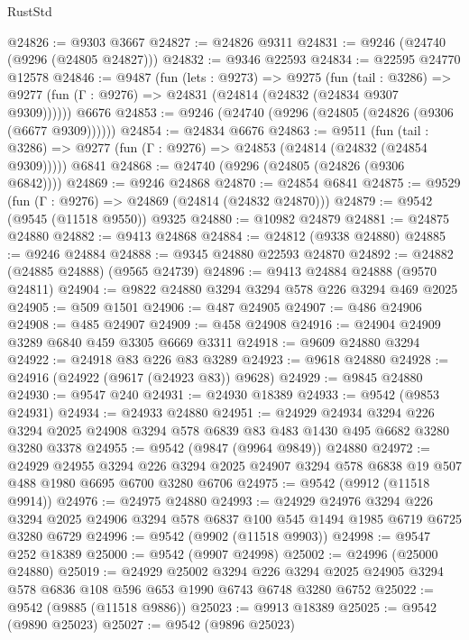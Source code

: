 \begin{lexlean}{RustStd}
\begin{coremodule}
@24826 := @9303 @3667
@24827 := @24826 @9311
@24831 := @9246 (@24740 (@9296 (@24805 @24827)))
@24832 := @9346 @22593
@24834 := @22595 @24770 @12578
@24846 := @9487
    (fun (lets : @9273) =>
    @9275
      (fun (tail : @3286) =>
      @9277 (fun (Γ : @9276) => @24831 (@24814 (@24832 (@24834 @9307 @9309))))))
    @6676
@24853 := @9246 (@24740 (@9296 (@24805 (@24826 (@9306 (@6677 @9309))))))
@24854 := @24834 @6676
@24863 := @9511
    (fun (tail : @3286) => @9277 (fun (Γ : @9276) => @24853 (@24814 (@24832 (@24854 @9309)))))
    @6841
@24868 := @24740 (@9296 (@24805 (@24826 (@9306 @6842))))
@24869 := @9246 @24868
@24870 := @24854 @6841
@24875 := @9529 (fun (Γ : @9276) => @24869 (@24814 (@24832 @24870)))
@24879 := @9542 (@9545 (@11518 @9550)) @9325
@24880 := @10982 @24879
@24881 := @24875 @24880
@24882 := @9413 @24868
@24884 := @24812 (@9338 @24880)
@24885 := @9246 @24884
@24888 := @9345 @24880 @22593 @24870
@24892 := @24882 (@24885 @24888) (@9565 @24739)
@24896 := @9413 @24884 @24888 (@9570 @24811)
@24904 := @9822 @24880 @3294 @3294 @578 @226 @3294 @469 @2025
@24905 := @509 @1501
@24906 := @487 @24905
@24907 := @486 @24906
@24908 := @485 @24907
@24909 := @458 @24908
@24916 := @24904 @24909 @3289 @6840 @459 @3305 @6669 @3311
@24918 := @9609 @24880 @3294
@24922 := @24918 @83 @226 @83 @3289
@24923 := @9618 @24880
@24928 := @24916 (@24922 (@9617 (@24923 @83)) @9628)
@24929 := @9845 @24880
@24930 := @9547 @240
@24931 := @24930 @18389
@24933 := @9542 (@9853 @24931)
@24934 := @24933 @24880
@24951 := @24929
    @24934
    @3294
    @226
    @3294
    @2025
    @24908
    @3294
    @578
    @6839
    @83
    @483
    @1430
    @495
    @6682
    @3280
    @3280
    @3378
@24955 := @9542 (@9847 (@9964 @9849)) @24880
@24972 := @24929
    @24955
    @3294
    @226
    @3294
    @2025
    @24907
    @3294
    @578
    @6838
    @19
    @507
    @488
    @1980
    @6695
    @6700
    @3280
    @6706
@24975 := @9542 (@9912 (@11518 @9914))
@24976 := @24975 @24880
@24993 := @24929
    @24976
    @3294
    @226
    @3294
    @2025
    @24906
    @3294
    @578
    @6837
    @100
    @545
    @1494
    @1985
    @6719
    @6725
    @3280
    @6729
@24996 := @9542 (@9902 (@11518 @9903))
@24998 := @9547 @252 @18389
@25000 := @9542 (@9907 @24998)
@25002 := @24996 (@25000 @24880)
@25019 := @24929
    @25002
    @3294
    @226
    @3294
    @2025
    @24905
    @3294
    @578
    @6836
    @108
    @596
    @653
    @1990
    @6743
    @6748
    @3280
    @6752
@25022 := @9542 (@9885 (@11518 @9886))
@25023 := @9913 @18389
@25025 := @9542 (@9890 @25023)
@25027 := @9542 (@9896 @25023)

\end{coremodule}
\end{lexlean}
